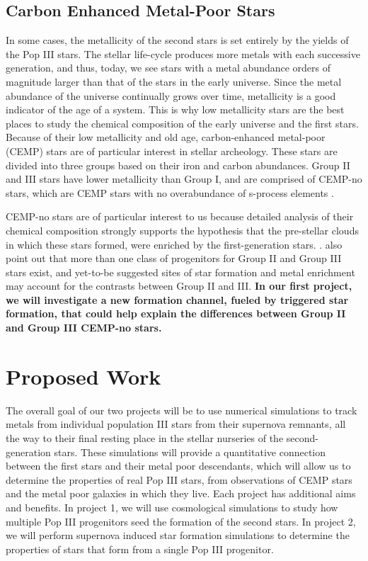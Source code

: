 \documentclass[a4paper, 12pt]{article}
\begin{document}
\subsection{Carbon Enhanced Metal-Poor Stars}

In some cases, the metallicity of the second stars is set entirely by the yields of the Pop III stars. The stellar life-cycle produces more metals with each successive generation, and thus, today, we see stars with a metal abundance orders of magnitude larger than that of the stars in the early universe. Since the metal abundance of the universe continually grows over time, metallicity is a good indicator of the age of a system. This is why low metallicity stars are the best places to study the chemical composition of the early universe and the first stars. Because of their low metallicity and old age, carbon-enhanced metal-poor (CEMP) stars are of particular interest in stellar archeology. These stars are divided into three groups based on their iron and carbon abundances. Group II and III stars have lower metallicity than Group I, and are comprised of CEMP-no stars, which are CEMP stars with no overabundance of s-process elements \citep{Maeder2015}. 

CEMP-no stars are of particular interest to us because detailed analysis of their chemical composition strongly supports the hypothesis that the pre-stellar clouds in which these stars formed, were enriched by the first-generation stars. \citep{Yoon2016}. \cite{Yoon2016} also point out that more than one class of progenitors for Group II and Group III stars exist, and yet-to-be suggested sites of star formation and metal enrichment may account for the contrasts between Group II and III. \textbf{In our first project, we will investigate a new formation channel, fueled by triggered star formation, that could help explain the differences between Group II and Group III CEMP-no stars.}


\section{Proposed Work}
The overall goal of our two projects will be to use numerical simulations to track metals from individual population III stars from their supernova remnants, all the way to their final resting place in the stellar nurseries of the second-generation stars. These simulations will provide a quantitative connection between the first stars and their metal poor descendants, which will allow us to determine the properties of real Pop III stars, from observations of CEMP stars and the metal poor galaxies in which they live. Each project has additional aims and benefits. In project 1, we will use cosmological simulations to study how multiple Pop III progenitors seed the formation of the second stars. In project 2, we will perform supernova induced star formation simulations to determine the properties of stars that form from a single Pop III progenitor.
\end{document}
